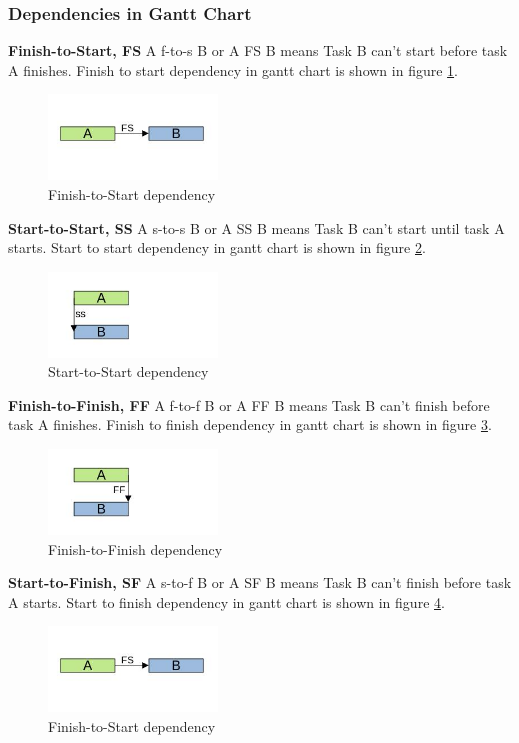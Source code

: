 \begin{spacing}{1}
\subsubsection{Dependencies in Gantt Chart}
\textbf{Finish-to-Start, FS} A f-to-s B or A FS B means Task B can't start before task A finishes. Finish to start dependency in gantt chart is shown in figure \ref{fig:FS}.
 \begin{figure}[H]
	\centering
	\includegraphics[width=0.4\textwidth]{FS}
	\caption{Finish-to-Start dependency}
	\label{fig:FS}
\end{figure} 
\textbf{Start-to-Start, SS} A s-to-s B or A SS B means Task B can't start until task A starts. Start to start dependency in gantt chart is shown in figure \ref{fig:SS}.
\begin{figure}[H]
	\centering
	\includegraphics[width=0.4\textwidth]{SS}
	\caption{Start-to-Start dependency}
	\label{fig:SS}
\end{figure} 
\textbf{Finish-to-Finish, FF} A f-to-f B or A FF B means Task B can't finish before task A finishes. Finish to finish dependency in gantt chart is shown in figure \ref{fig:FF}.
\begin{figure}[H]
	\centering
	\includegraphics[width=0.4\textwidth]{FF}
	\caption{Finish-to-Finish dependency}
	\label{fig:FF}
\end{figure} 
\textbf{Start-to-Finish, SF} A s-to-f B or A SF B means Task B can't finish before task A starts. Start to finish dependency in gantt chart is shown in figure \ref{fig:SF}.
\begin{figure}[H]
	\centering
	\includegraphics[width=0.4\textwidth]{FS}
	\caption{Finish-to-Start dependency}
	\label{fig:SF}
\end{figure} 


\end{spacing}
